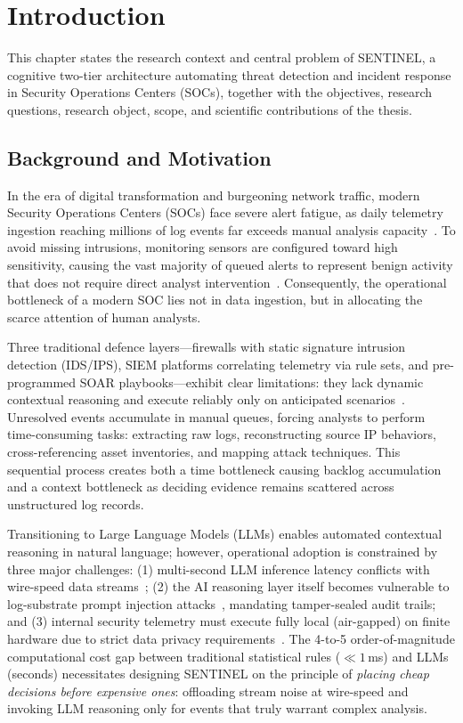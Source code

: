 \chapter{Introduction}
\label{ch:introduction}

This chapter states the research context and central problem of SENTINEL, a cognitive two-tier architecture automating threat detection and incident response in Security Operations Centers (SOCs), together with the objectives, research questions, research object, scope, and scientific contributions of the thesis.

\section{Background and Motivation}

In the era of digital transformation and burgeoning network traffic, modern Security Operations Centers (SOCs) face severe alert fatigue, as daily telemetry ingestion reaching millions of log events far exceeds manual analysis capacity~\cite{siem2021}. To avoid missing intrusions, monitoring sensors are configured toward high sensitivity, causing the vast majority of queued alerts to represent benign activity that does not require direct analyst intervention~\cite{alertfatigue2022, alahmadi2022}. Consequently, the operational bottleneck of a modern SOC lies not in data ingestion, but in allocating the scarce attention of human analysts.

Three traditional defence layers---firewalls with static signature intrusion detection (IDS/IPS), SIEM platforms correlating telemetry via rule sets, and pre-programmed SOAR playbooks---exhibit clear limitations: they lack dynamic contextual reasoning and execute reliably only on anticipated scenarios~\cite{soar2025}. Unresolved events accumulate in manual queues, forcing analysts to perform time-consuming tasks: extracting raw logs, reconstructing source IP behaviors, cross-referencing asset inventories, and mapping attack techniques. This sequential process creates both a time bottleneck causing backlog accumulation and a context bottleneck as deciding evidence remains scattered across unstructured log records.

Transitioning to Large Language Models (LLMs) enables automated contextual reasoning in natural language; however, operational adoption is constrained by three major challenges: (1) multi-second LLM inference latency conflicts with wire-speed data streams~\cite{vaswani2017}; (2) the AI reasoning layer itself becomes vulnerable to log-substrate prompt injection attacks~\cite{promptinjection2023}, mandating tamper-sealed audit trails; and (3) internal security telemetry must execute fully local (air-gapped) on finite hardware due to strict data privacy requirements~\cite{nist80207}. The 4-to-5 order-of-magnitude computational cost gap between traditional statistical rules ($\ll 1$\,ms) and LLMs (seconds) necessitates designing SENTINEL on the principle of \textit{placing cheap decisions before expensive ones}: offloading stream noise at wire-speed and invoking LLM reasoning only for events that truly warrant complex analysis.

